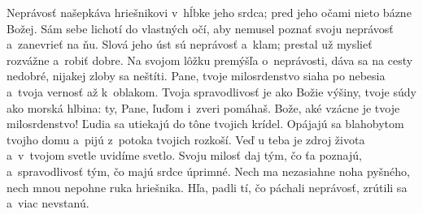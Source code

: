 Neprávosť našepkáva hriešnikovi v~hĺbke jeho srdca;
pred jeho očami nieto bázne Božej.
\versseparator
Sám sebe lichotí do vlastných očí,
aby nemusel poznať svoju neprávosť a~zanevrieť na ňu.
Slová jeho úst sú neprávosť a~klam;
prestal už myslieť rozvážne a~robiť dobre.
Na svojom lôžku premýšľa o~neprávosti,
dáva sa na cesty nedobré,
nijakej zloby sa neštíti.
\versseparator
Pane, tvoje milosrdenstvo siaha po nebesia
a~tvoja vernosť až k~oblakom.
Tvoja spravodlivosť je ako Božie výšiny,
tvoje súdy ako morská hlbina:
ty, Pane, ľuďom i~zveri pomáhaš.
\versseparator
Bože, aké vzácne je tvoje milosrdenstvo!
Ľudia sa utiekajú do tône tvojich krídel.
Opájajú sa blahobytom tvojho domu
a~pijú z~potoka tvojich rozkoší.
Veď u teba je zdroj života
a~v~tvojom svetle uvidíme svetlo.
\versseparator
Svoju milosť daj tým, čo ťa poznajú,
a~spravodlivosť tým, čo majú srdce úprimné.
Nech ma nezasiahne noha pyšného,
nech mnou nepohne ruka hriešnika.
Hľa, padli tí, čo páchali neprávosť,
zrútili sa a~viac nevstanú. 
